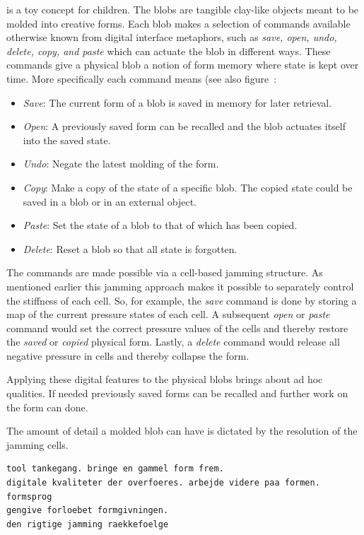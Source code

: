  is a toy concept for children.
The blobs are tangible clay-like objects meant to be molded into creative forms.
Each blob makes a selection of commands available otherwise known from digital interface metaphors, such as \emph{save, open, undo, delete, copy, and paste} which can actuate the blob in different ways.
These commands give a physical blob a notion of form memory where state is kept over time.
More specifically each command means (see also figure~:
\begin{itemize}
	\item{\emph{Save}: The current form of a blob is saved in memory for later retrieval.}
	\item{\emph{Open}: A previously saved form can be recalled and the blob actuates itself into the saved state.}
	\item{\emph{Undo}: Negate the latest molding of the form.}
	\item{\emph{Copy}: Make a copy of the state of a specific blob. The copied state could be saved in a blob or in an external object.}
	\item{\emph{Paste}: Set the state of a blob to that of which has been copied.} 
	\item{\emph{Delete}: Reset a blob so that all state is forgotten.} 
\end{itemize}
The commands are made possible via a cell-based jamming structure.
As mentioned earlier this jamming approach makes it possible to separately control the stiffness of each cell.
So, for example, the \emph{save} command is done by storing a map of the current pressure states of each cell.
A subsequent \emph{open} or \emph{paste} command would set the correct pressure values of the cells and thereby restore the \emph{saved} or \emph{copied} physical form.
Lastly, a \emph{delete} command would release all negative pressure in cells and thereby collapse the form.

Applying these digital features to the physical blobs brings about ad hoc qualities.
If needed previously saved forms can be recalled and further work on the form can done.

The amount of detail a molded blob can have is dictated by the resolution of the jamming cells.
\blank
{}
\begin{verbatim}
tool tankegang. bringe en gammel form frem.
digitale kvaliteter der overfoeres. arbejde videre paa formen. formsprog
gengive forloebet formgivningen.
den rigtige jamming raekkefoelge
\end{verbatim}

